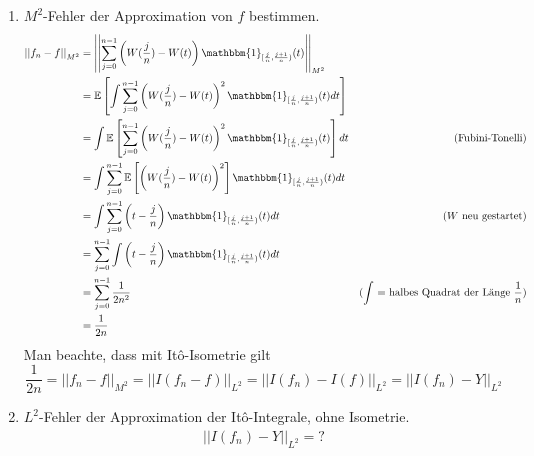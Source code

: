 \documentclass[a4paper,11pt,notitlepage,fullpage]{article}
\newcommand{\Ee}[1]{\mathbb E\left[#1\right]}
\newcommand{\indd}[1]{\mathbbm{1}_{#1}}
\newcommand{\norm}[2]{\left|\left|{#1}\right|\right|_{#2}}
\begin{document}
\begin{enumerate}
\begin{enumerate}
\item $M^2$-Fehler der Approximation von $f$ bestimmen.
\begin{align*}
\norm{f_n-f}{M^2} &= \norm{\sum_{j=0}^{n-1} \left(W(\frac{j}{n})-W(t)\right) \indd{[\frac{j}{n}, \frac{j+1}{n})}(t)}{M^2}\\
&= \Ee{\int \sum_{j=0}^{n-1} \left(W(\frac{j}{n})-W(t)\right)^2 \indd{[\frac{j}{n}, \frac{j+1}{n})}(t) dt}\\
&= \int \Ee{\sum_{j=0}^{n-1} \left(W(\frac{j}{n})-W(t)\right)^2 \indd{[\frac{j}{n}, \frac{j+1}{n})}(t) } dt &\text{(Fubini-Tonelli)}\\
&= \int \sum_{j=0}^{n-1} \Ee{\left(W(\frac{j}{n})-W(t)\right)^2} \indd{[\frac{j}{n}, \frac{j+1}{n})}(t)  dt\\
&= \int \sum_{j=0}^{n-1} \left(t-\frac{j}{n}\right) \indd{[\frac{j}{n}, \frac{j+1}{n})}(t)  dt & \text{($W$ neu gestartet)}\\
&=  \sum_{j=0}^{n-1} \int\left(t-\frac{j}{n}\right) \indd{[\frac{j}{n}, \frac{j+1}{n})}(t)  dt \\
&=  \sum_{j=0}^{n-1} \frac{1}{2n^2} & \text{($\int$ = halbes Quadrat der Länge $\frac{1}{n}$)}\\
&= \frac{1}{2n}
\end{align*}
Man beachte, dass mit Itô-Isometrie gilt
$$\frac{1}{2n} = \norm{f_n-f}{M^2} = \norm{I(f_n-f)}{L^2} = \norm{I(f_n)-I(f)}{L^2} = \norm{I(f_n)-Y}{L^2}$$

\item $L^2$-Fehler der Approximation der Itô-Integrale, ohne Isometrie.
\begin{align*}
\norm{I(f_n)-Y}{L^2} = ?
\end{align*}
\end{enumerate}



\end{enumerate}
\end{document}
